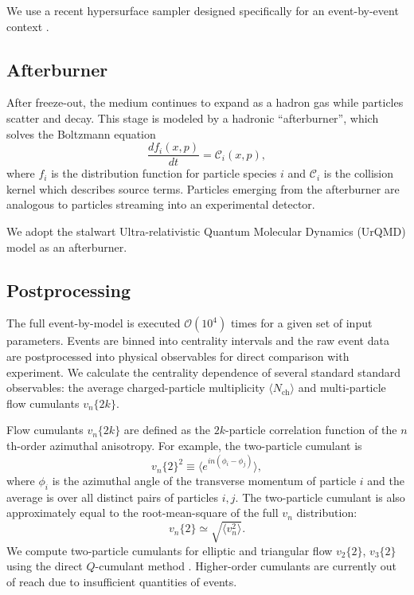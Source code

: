 \documentclass[aps,prc,reprint,amsmath]{revtex4-1}
\newcommand{\avg}[1]{\langle #1 \rangle}
\newcommand{\nch}{N_\text{ch}}
\newcommand{\vnk}[2]{v_#1\{#2\}}
\begin{document}
We use a recent hypersurface sampler designed specifically for an event-by-event context \cite{Qiu:2013wca,Shen:2014vra}.

\subsection{Afterburner}

After freeze-out, the medium continues to expand as a hadron gas while particles scatter and decay.
This stage is modeled by a hadronic ``afterburner'', which solves the Boltzmann equation
\begin{equation}
  \frac{df_i(x,p)}{dt} = \mathcal C_i(x,p),
\end{equation}
where $f_i$ is the distribution function for particle species $i$ and $\mathcal C_i$ is the collision kernel which describes source terms.
Particles emerging from the afterburner are analogous to particles streaming into an experimental detector.

We adopt the stalwart Ultra-relativistic Quantum Molecular Dynamics (UrQMD) model \cite{Bass:1998ca,Bleicher:1999xi} as an afterburner.

\subsection{Postprocessing}

The full event-by-model is executed $\mathcal O(10^4)$ times for a given set of input parameters.
Events are binned into centrality intervals and the raw event data are postprocessed into physical observables for direct comparison with experiment.
We calculate the centrality dependence of several standard standard observables:
the average charged-particle multiplicity $\avg\nch$ and multi-particle flow cumulants $\vnk n {2k}$.

Flow cumulants $\vnk n {2k}$ are defined as the $2k$-particle correlation function of the $n$th-order azimuthal anisotropy.
For example, the two-particle cumulant is
\begin{equation}
  \vnk n 2^2 \equiv \bigl\langle e^{in(\phi_i - \phi_j)} \bigr\rangle,
\end{equation}
where $\phi_i$ is the azimuthal angle of the transverse momentum of particle $i$ and the average is over all distinct pairs of particles $i,j$.
The two-particle cumulant is also approximately equal to the root-mean-square of the full $v_n$ distribution:
\begin{equation}
  \vnk n 2 \simeq \sqrt{\avg{v_n^2}}.
\end{equation}
We compute two-particle cumulants for elliptic and triangular flow $\vnk 2 2$, $\vnk 3 2$ using the direct $Q$-cumulant method \cite{Bilandzic:2010jr}.
Higher-order cumulants are currently out of reach due to insufficient quantities of events.
\end{document}
